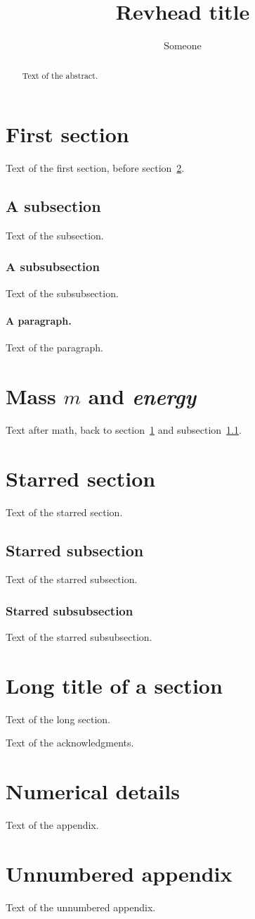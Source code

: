 \documentclass{revtex4-2}
\begin{document}
\title{Revhead title}
\author{Someone}
\begin{abstract}
Text of the abstract.
\end{abstract}
\maketitle
\section{First section}\label{sec:first}
Text of the first section, before section~\ref{sec:math}.
\subsection{A subsection}\label{sec:sub}
Text of the subsection.
\subsubsection{A subsubsection}
Text of the subsubsection.
\paragraph{A paragraph.}
Text of the paragraph.
\section{Mass $m$ and \emph{energy}}\label{sec:math}
Text after math, back to section~\ref{sec:first} and
subsection~\ref{sec:sub}.
\section*{Starred section}
Text of the starred section.
\subsection*{Starred subsection}
Text of the starred subsection.
\subsubsection*{Starred subsubsection}
Text of the starred subsubsection.
\section[Short]{Long title of a section}
Text of the long section.
\begin{acknowledgments}
Text of the acknowledgments.
\end{acknowledgments}
\appendix
\section{Numerical details}
Text of the appendix.
\section*{Unnumbered appendix}
Text of the unnumbered appendix.
\end{document}

